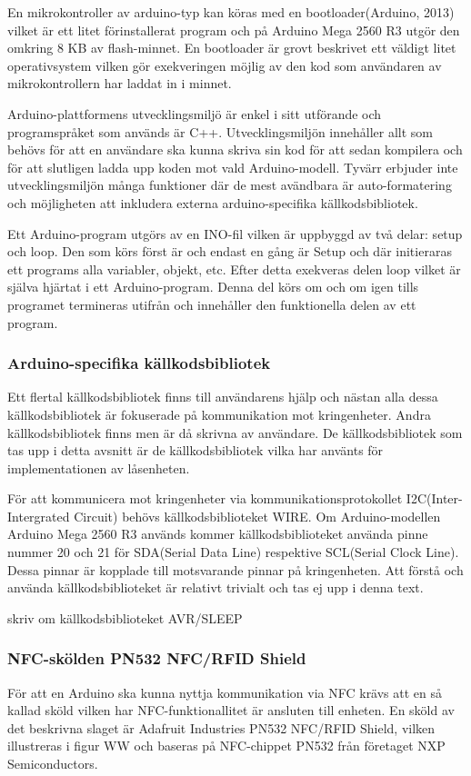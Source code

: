 \documentclass[11pt]{article}
\begin{document}

En mikrokontroller av arduino-typ kan köras med en bootloader(Arduino, 2013) vilket är ett litet förinstallerat program och på Arduino Mega 2560 R3 utgör den omkring 8 KB av flash-minnet. En bootloader är grovt beskrivet ett väldigt litet operativsystem vilken gör exekveringen möjlig av den kod som användaren av mikrokontrollern har laddat in i minnet. 

Arduino-plattformens utvecklingsmiljö är enkel i sitt utförande och programspråket som används är C++.  Utvecklingsmiljön innehåller allt som behövs för att en användare ska kunna skriva sin kod för att sedan kompilera och för att slutligen ladda upp koden mot vald Arduino-modell. Tyvärr erbjuder inte utvecklingsmiljön många funktioner där de mest avändbara är auto-formatering och möjligheten att inkludera externa arduino-specifika källkodsbibliotek. 


Ett Arduino-program utgörs av en INO-fil vilken är uppbyggd av två delar: setup och loop. Den som körs först är och endast en gång är Setup och där initieraras ett programs alla variabler, objekt, etc. Efter detta exekveras delen loop vilket är själva hjärtat i ett Arduino-program. Denna del körs om och om igen tills programet termineras utifrån och innehåller den funktionella delen av ett program.

\subsubsection{Arduino-specifika källkodsbibliotek}
Ett flertal källkodsbibliotek finns till användarens hjälp och nästan alla dessa källkodsbibliotek är fokuserade på kommunikation mot kringenheter. Andra källkodsbibliotek finns men är då skrivna av användare. De källkodsbibliotek som tas upp i detta avsnitt är de källkodsbibliotek vilka har använts för implementationen av låsenheten.

För att kommunicera mot kringenheter via kommunikationsprotokollet I2C(Inter-Intergrated Circuit) behövs källkodsbiblioteket WIRE. Om Arduino-modellen Arduino Mega 2560 R3 används kommer källkodsbiblioteket använda pinne nummer 20 och 21 för SDA(Serial Data Line) respektive SCL(Serial Clock Line). Dessa pinnar är kopplade till motsvarande pinnar på kringenheten. Att förstå och använda källkodsbiblioteket är relativt trivialt och tas ej upp i denna text.

skriv om källkodsbiblioteket AVR/SLEEP

\subsubsection{NFC-skölden PN532 NFC/RFID Shield}
För att en Arduino ska kunna nyttja kommunikation via NFC krävs att en så kallad sköld vilken har NFC-funktionallitet är ansluten till enheten. En sköld av det beskrivna slaget är Adafruit Industries PN532 NFC/RFID Shield, vilken illustreras i figur WW och baseras på NFC-chippet PN532 från företaget NXP Semiconductors. 
\end{document}

